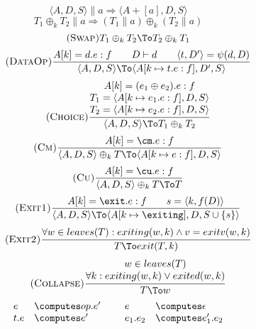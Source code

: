 \begin{figure}[ht!]
\centering
\flushright{}
\[
  \tag{\sc Entrance1}\label{rule:entrance1}
  \langle A,D,S\rangle \| a \Longrightarrow \langle A+[a],D,S\rangle
\]
\[
  \tag{\sc Entrance2}\label{rule:entrance2}
  T_1\oplus_k T_2 \| a \Longrightarrow (T_1 \| a)\oplus_k (T_2 \| a)
\]
\flushright{}
\[
  \tag{\sc Swap}\label{rule:swap}
  T_1\oplus_k T_2 \To T_2\oplus_k T_1
\]
\[
  \tag{\sc DataOp}\label{rule:dataop}
  \frac
  {A[k]=d.e:f \qquad D\vdash d \qquad \langle t,D'\rangle=\psi(d,D)}
  {\langle A,D,S\rangle \To \langle A[k\mapsto t.e:f], D', S\rangle}
\]
\[
  \tag{\sc Choice}\label{rule:choice}
  \frac
  {\begin{matrix}
    A[k]=(e_1\oplus e_2).e:f \\
    T_1=\langle A[k\mapsto e_1.e:f],D,S\rangle \\
    T_2=\langle A[k\mapsto e_2.e:f],D,S\rangle
   \end{matrix}}
  {\langle A,D,S\rangle \To T_1\oplus_k T_2}
\]
\[
  \tag{\sc Cm}\label{rule:cm}
  \frac
  {A[k]=\cm.e:f}
  {\langle A,D,S\rangle\oplus_k T \To \langle A[k\mapsto e:f],D,S\rangle}
\]
\[
  \tag{\sc Cu}\label{rule:cu}
  \frac
  {A[k]=\cu.e:f}
  {\langle A,D,S\rangle\oplus_k T \To T}
\]
\[
  \tag{\sc Exit1}\label{rule:exit1}
  \frac
  {A[k]=\exit.e :f \qquad s=\langle k,f(D)\rangle}
  {\langle A,D,S\rangle \To \langle A[k\mapsto\exiting],D,S\cup\{s\}\rangle}
\]
\[
  \tag{\sc Exit2}\label{rule:exit2}
  \frac
  {\begin{matrix}
    \forall w\in leaves(T): exiting(w,k) \land v = exitv(w,k)
   \end{matrix}}
  {T \To exit(T,k)}
\]
\[
  \tag{\sc Collapse}\label{rule:collapse}
  \frac
  {\begin{matrix}
    w \in leaves(T) \\
    \forall k: exiting(w,k) \lor exited(w,k)
   \end{matrix}}
  {T \To w}
\]
\flushright{}
\[
\begin{array}{llll}
  e &\computes op.e' \hspace*{5mm} &
  e &\computes \epsilon \\
  t.e &\computes e' &
  e_1.e_2 &\computes e_1'.e_2 \\
\end{array}
\]

\end{figure}
